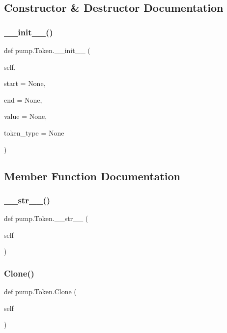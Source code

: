 \subsection{Constructor \& Destructor Documentation}
\mbox{\label{classpump_1_1Token_a55e6843fd724dc3771861372d5116f48}} 
\subsubsection{\texorpdfstring{\_\_init\_\_()}{\_\_init\_\_()}}
{\footnotesize\ttfamily def pump.\+Token.\+\_\+\+\_\+init\+\_\+\+\_\+ (\begin{DoxyParamCaption}\item[{}]{self,  }\item[{}]{start = {\ttfamily None},  }\item[{}]{end = {\ttfamily None},  }\item[{}]{value = {\ttfamily None},  }\item[{}]{token\+\_\+type = {\ttfamily None} }\end{DoxyParamCaption})}



\subsection{Member Function Documentation}
\mbox{\label{classpump_1_1Token_ad0079ae4449d89bc2d5756488099cb33}} 
\subsubsection{\texorpdfstring{\_\_str\_\_()}{\_\_str\_\_()}}
{\footnotesize\ttfamily def pump.\+Token.\+\_\+\+\_\+str\+\_\+\+\_\+ (\begin{DoxyParamCaption}\item[{}]{self }\end{DoxyParamCaption})}

\mbox{\label{classpump_1_1Token_abc0f2d2a0bcad953f5fc85a4e52076eb}} 
\subsubsection{\texorpdfstring{Clone()}{Clone()}}
{\footnotesize\ttfamily def pump.\+Token.\+Clone (\begin{DoxyParamCaption}\item[{}]{self }\end{DoxyParamCaption})}

